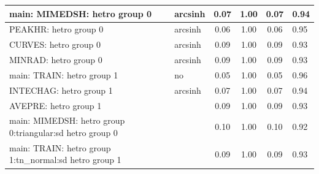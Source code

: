 \begin{table}
\begin{center}
\begin{tabular}{|l|l|c|c|c|l|}
			\hline
			main: MIMEDSH: hetro group 0 & arcsinh & 0.07 & 1.00 & 0.07 & 0.94 \\
			\hline
			PEAKHR: hetro group 0 & arcsinh & 0.06 & 1.00 & 0.06 & 0.95 \\
			\hline
			CURVES: hetro group 0 & arcsinh & 0.09 & 1.00 & 0.09 & 0.93 \\
			\hline
			MINRAD: hetro group 0 & arcsinh & 0.09 & 1.00 & 0.09 & 0.93 \\
			\hline
			main: TRAIN: hetro group 1 & no & 0.05 & 1.00 & 0.05 & 0.96 \\
			\hline
			INTECHAG: hetro group 1 & arcsinh & 0.07 & 1.00 & 0.07 & 0.94 \\
			\hline
			AVEPRE: hetro group 1 &  & 0.09 & 1.00 & 0.09 & 0.93 \\
			\hline
			main: MIMEDSH: hetro group 0:triangular:sd  hetro group 0 &  & 0.10 & 1.00 & 0.10 & 0.92 \\
			\hline
			main: TRAIN: hetro group 1:tn_normal:sd  hetro group 1 &  & 0.09 & 1.00 & 0.09 & 0.93 \\
			\hline
		\end{tabular}
	\end{center}
\end{table}